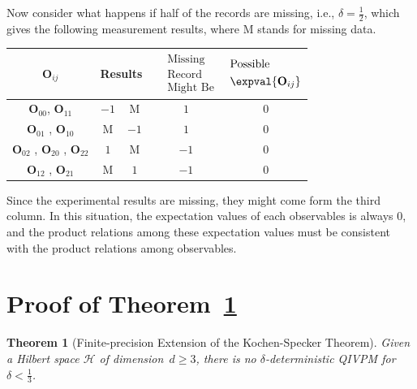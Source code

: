 \documentclass[english,reprint, aps, prl,superscriptaddress, showpacs,
showkeys, longbibliography, amsmath, amssymb, floatfix]{revtex4-1}
\theoremstyle{plain}
\newtheorem{thm}{Theorem}
\theoremstyle{definition}
\newcommand{\Hilb}{\mathcal{H}}
\newcommand{\missing}{\text{M}}
\begin{document}
Now consider what happens if half of the records are missing, i.e.,
$\delta=\frac{1}{2}$, which gives the following measurement results,
where $\missing$ stands for missing data.
\begin{center}
\begin{tabular}{ccccc}
\toprule 
\addlinespace
$\mathbf{O}_{ij}$  & \multicolumn{2}{c}{Results} & $\begin{aligned} & \textrm{Missing}\\
 & \textrm{Record}\\
 & \textrm{Might Be}
\end{aligned}
$ & $\begin{aligned} & \textrm{Possible}\\
 & \expval{\mathbf{O}_{ij}}
\end{aligned}
$\tabularnewline
\midrule
\midrule 
\addlinespace
$\mathbf{O}_{00}$, $\mathbf{O}_{11}$ & $-1$ & $\missing$ & $1$ & $0$\tabularnewline
\midrule 
\addlinespace
$\mathbf{O}_{01}$ , $\mathbf{O}_{10}$  & $\missing$ & $-1$ & $1$ & $0$\tabularnewline
\midrule 
\addlinespace
$\mathbf{O}_{02}$ , $\mathbf{O}_{20}$ , $\mathbf{O}_{22}$  & $1$ & $\missing$ & $-1$ & $0$\tabularnewline
\midrule 
\addlinespace
$\mathbf{O}_{12}$ , $\mathbf{O}_{21}$  & $\missing$ & $1$ & $-1$ & $0$\tabularnewline
\bottomrule
\end{tabular}
\par\end{center}

\noindent Since the experimental results are missing, they might come
form the third column. In this situation, the expectation values of
each observables is always $0$, and the product relations among these
expectation values must be consistent with the product relations among
observables.



\appendix

\section{\label{sec:Proof-of-Theorem}Proof of Theorem~\ref{cor:Kochen-Specker-IVPM}}

\begin{thm}[Finite-precision Extension of the Kochen-Specker Theorem]
\label{cor:Kochen-Specker-IVPM} Given a Hilbert space $\Hilb$ of
dimension~$d\ge3$, there is no $\delta$-deterministic QIVPM for
$\delta<\frac{1}{3}$.\end{thm}
\end{document}
